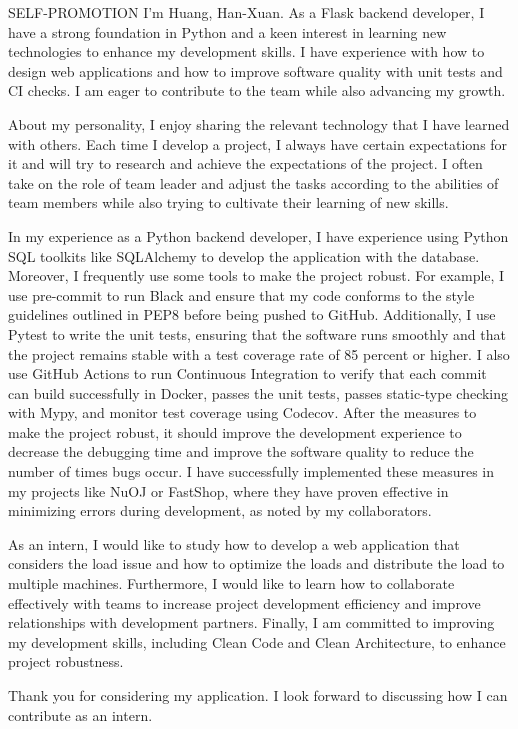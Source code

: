 \documentclass{resume} %
\begin{document}
\begin{rSection}{SELF-PROMOTION}
    I'm Huang, Han-Xuan. As a Flask backend developer, I have a strong foundation in Python and a keen interest in learning new technologies to enhance my development skills. I have experience with how to design web applications and how to improve software quality with unit tests and CI checks. I am eager to contribute to the team while also advancing my growth. 

    About my personality, I enjoy sharing the relevant technology that I have learned with others. Each time I develop a project, I always have certain expectations for it and will try to research and achieve the expectations of the project. I often take on the role of team leader and adjust the tasks according to the abilities of team members while also trying to cultivate their learning of new skills.

    In my experience as a Python backend developer, I have experience using Python SQL toolkits like SQLAlchemy to develop the application with the database. Moreover, I frequently use some tools to make the project robust. For example, I use pre-commit to run Black and ensure that my code conforms to the style guidelines outlined in PEP8 before being pushed to GitHub. Additionally, I use Pytest to write the unit tests, ensuring that the software runs smoothly and that the project remains stable with a test coverage rate of 85 percent or higher. I also use GitHub Actions to run Continuous Integration to verify that each commit can build successfully in Docker, passes the unit tests, passes static-type checking with Mypy, and monitor test coverage using Codecov. After the measures to make the project robust, it should improve the development experience to decrease the debugging time and improve the software quality to reduce the number of times bugs occur. I have successfully implemented these measures in my projects like NuOJ or FastShop, where they have proven effective in minimizing errors during development, as noted by my collaborators.
    
    As an intern, I would like to study how to develop a web application that considers the load issue and how to optimize the loads and distribute the load to multiple machines. Furthermore, I would like to learn how to collaborate effectively with teams to increase project development efficiency and improve relationships with development partners. Finally, I am committed to improving my development skills, including Clean Code and Clean Architecture, to enhance project robustness.
    
    Thank you for considering my application. I look forward to discussing how I can contribute as an intern.
\end{rSection}
\end{document}
